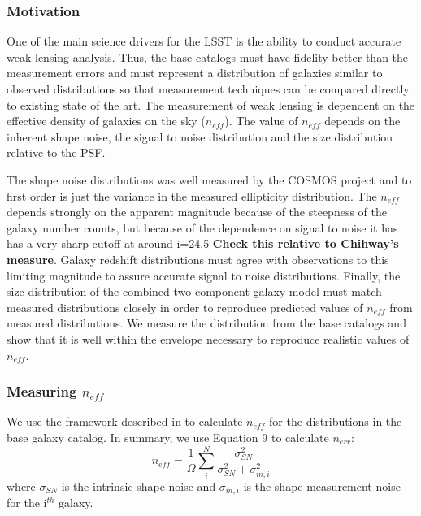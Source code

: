 \documentclass[]{article}
\begin{document}
\subsubsection{Motivation}
One of the main science drivers for the LSST is the ability to conduct accurate weak lensing analysis.  Thus, the base catalogs must 
have fidelity better than the measurement errors and must represent a distribution of galaxies similar to observed distributions
so that measurement techniques can be compared directly to existing state of the art.  The measurement of weak lensing is dependent 
on the effective density of galaxies on the sky ($n_{eff}$).  The value of $n_{eff}$ depends on the inherent shape noise, the signal to noise distribution and the size distribution relative to the PSF.

The shape noise distributions was well measured by the COSMOS project and to first order is just the variance in the measured 
ellipticity distribution.  The $n_{eff}$ depends strongly on the apparent magnitude because of the steepness of the galaxy number
counts, but because of the dependence on signal to noise it has
has a very sharp cutoff at around i=24.5 {\bf Check this relative to Chihway's measure}.  Galaxy redshift distributions must
agree with observations to this limiting magnitude to assure accurate signal to noise distributions.  Finally, the size distribution
of the combined two component galaxy model must match measured distributions closely in order to reproduce predicted
values of $n_{eff}$ from measured distributions.  We measure the distribution from the base catalogs and show that it is well
within the envelope necessary to reproduce realistic values of $n_{eff}$.

\subsubsection{Measuring $n_{eff}$}
We use the framework described in \cite{chang} to calculate $n_{eff}$ for the distributions in the 
base galaxy catalog.  In summary, we use Equation 9 to calculate $n_{err}$:
\begin{equation}
n_{eff} = \frac{1}{\Omega}\sum^N_i\frac{\sigma^2_{SN}}{\sigma^2_{SN}+\sigma^2_{m,i}}
\end{equation}
where $\sigma_{SN}$ is the intrinsic shape noise and $\sigma_{m,i}$ is the shape measurement noise for the i$^{th}$ galaxy.
\end{document}
